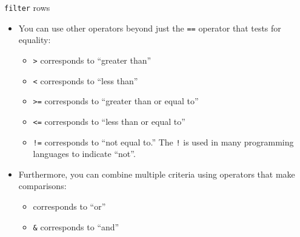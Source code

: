 \documentclass[
  ignorenonframetext,
]{beamer}
\providecommand{\tightlist}{%
  \setlength{\itemsep}{0pt}\setlength{\parskip}{0pt}}
\begin{document}
\begin{frame}[fragile]{\texttt{filter} rows}
\label{filter-rows-2}
\begin{itemize}
\item
  You can use other operators beyond just the \texttt{==} operator that
  tests for equality:

  \begin{itemize}
  \tightlist
  \item
    \texttt{\textgreater{}} corresponds to ``greater than''
  \item
    \texttt{\textless{}} corresponds to ``less than''
  \item
    \texttt{\textgreater{}=} corresponds to ``greater than or equal to''
  \item
    \texttt{\textless{}=} corresponds to ``less than or equal to''
  \item
    \texttt{!=} corresponds to ``not equal to.'' The \texttt{!} is used
    in many programming languages to indicate ``not''.
  \end{itemize}
\item
  Furthermore, you can combine multiple criteria using operators that
  make comparisons:

  \begin{itemize}
  \tightlist
  \item
    \texttt{\textbar{}} corresponds to ``or''
  \item
    \texttt{\&} corresponds to ``and''
  \end{itemize}
\end{itemize}
\end{frame}
\end{document}
